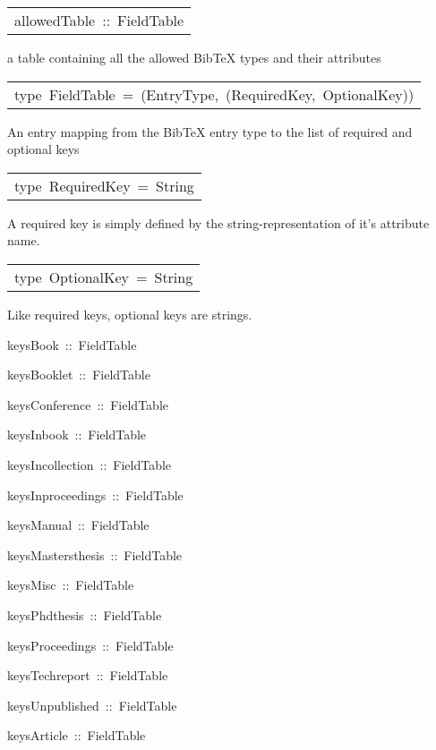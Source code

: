 \begin{haddockdesc}
\item[\begin{tabular}{@{}l}
allowedTable\ ::\ {\char 91}FieldTable{\char 93}
\end{tabular}]\haddockbegindoc
a table containing all the allowed BibTeX types and their attributes
\par

\end{haddockdesc}
\begin{haddockdesc}
\item[\begin{tabular}{@{}l}
type\ FieldTable\ =\ (EntryType,\ ({\char 91}RequiredKey{\char 93},\ {\char 91}OptionalKey{\char 93}))
\end{tabular}]\haddockbegindoc
An entry mapping from the BibTeX entry type to the list of required and optional keys
\par

\end{haddockdesc}
\begin{haddockdesc}
\item[\begin{tabular}{@{}l}
type\ RequiredKey\ =\ String
\end{tabular}]\haddockbegindoc
A required key is simply defined by the string-representation of it's attribute name.
\par

\end{haddockdesc}
\begin{haddockdesc}
\item[\begin{tabular}{@{}l}
type\ OptionalKey\ =\ String
\end{tabular}]\haddockbegindoc
Like required keys, optional keys are strings.
\par

\end{haddockdesc}
\begin{haddockdesc}
\item[
keysBook\ ::\ FieldTable
]
\item[
keysBooklet\ ::\ FieldTable
]
\item[
keysConference\ ::\ FieldTable
]
\item[
keysInbook\ ::\ FieldTable
]
\item[
keysIncollection\ ::\ FieldTable
]
\item[
keysInproceedings\ ::\ FieldTable
]
\item[
keysManual\ ::\ FieldTable
]
\item[
keysMastersthesis\ ::\ FieldTable
]
\item[
keysMisc\ ::\ FieldTable
]
\item[
keysPhdthesis\ ::\ FieldTable
]
\item[
keysProceedings\ ::\ FieldTable
]
\item[
keysTechreport\ ::\ FieldTable
]
\item[
keysUnpublished\ ::\ FieldTable
]
\item[
keysArticle\ ::\ FieldTable
]
\end{haddockdesc}